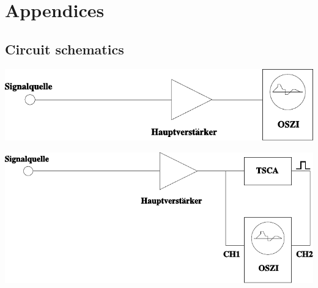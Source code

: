 \newpage
%
\section{Appendices}
%
\subsection{Circuit schematics}
%
\vspace{10mm}
%
\begin{multicols}{2}
%
\minipage{\linewidth}
    \begin{center}
        \captionsetup{type=figure}
        \begin{adjustbox}{max width=\linewidth, keepaspectratio}
            \includegraphics[]{pdf/Schaltung1}
        \end{adjustbox}
        \label{fig:Schaltung1}
    \end{center}
\endminipage
%
\vspace{10mm}
%
\minipage{\linewidth}
    \begin{center}
        \captionsetup{type=figure}
        \begin{adjustbox}{max width=\linewidth, keepaspectratio}
            \includegraphics[]{pdf/Schaltung2}
        \end{adjustbox}
        \label{fig:Schaltung2}
    \end{center}
\endminipage
%
\vspace{10mm}
%
\minipage{\linewidth}
    \begin{center}

\end{center}
\end{multicols}
